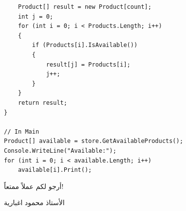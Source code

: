 \documentclass[14pt]{extarticle}
\begin{document}
\begin{enumerate}
\begin{boxSolution}
\begin{english}
{\begin{verbatim}
    Product[] result = new Product[count];
    int j = 0;
    for (int i = 0; i < Products.Length; i++)
    {
        if (Products[i].IsAvailable())
        {
            result[j] = Products[i];
            j++;
        }
    }
    return result;
}

// In Main
Product[] available = store.GetAvailableProducts();
Console.WriteLine("Available:");
for (int i = 0; i < available.Length; i++)
    available[i].Print();
\end{verbatim}
}
\end{english}
\end{boxSolution}
\clearpage
\fi

\end{enumerate}

\vspace{1em}
\begin{flushleft}
أرجو لكم عملاً ممتعاً!

الأستاذ محمود اغبارية
\end{flushleft}
\end{document}
